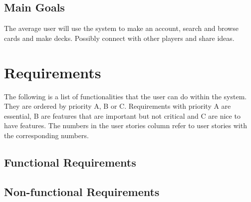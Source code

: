 \documentclass[paper=a4, fontsize=11pt]{scrartcl} %
\numberwithin{equation}{section} %
\numberwithin{figure}{section} %
\numberwithin{table}{section} %
\begin{document}
\subsection{Main Goals}
The average user will use the system to make an account, search and browse cards and make decks. Possibly connect with other players and share ideas.

\section{Requirements}
The following is a list of functionalities that the user can do within the system. They are ordered by priority A, B or C. Requirements with priority A are essential, B are features that are important but not critical and C are nice to have features. The numbers in the user stories column refer to user stories with the corresponding numbers.
\subsection{Functional Requirements}
\begin{center}
\end{center}
\subsection{Non-functional Requirements}
\begin{center}
\end{center}
\end{document}
